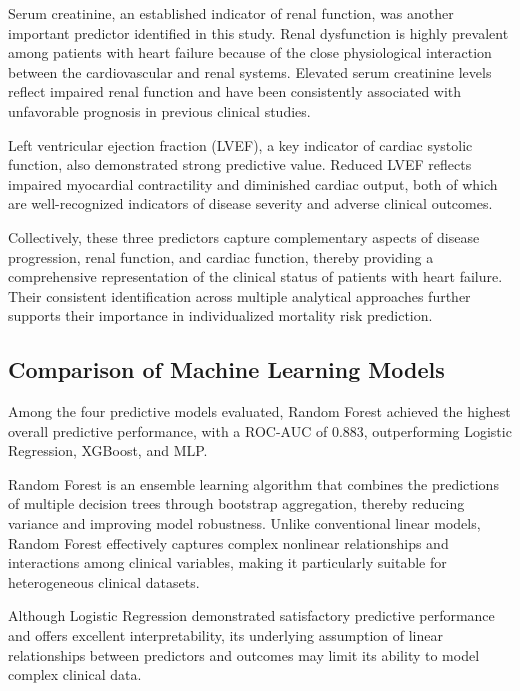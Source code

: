 \documentclass[12pt]{article}
\begin{document}
Serum creatinine, an established indicator of renal function, was another important predictor identified in this study. Renal dysfunction is highly prevalent among patients with heart failure because of the close physiological interaction between the cardiovascular and renal systems. Elevated serum creatinine levels reflect impaired renal function and have been consistently associated with unfavorable prognosis in previous clinical studies.\cite{McDonagh2021,Damman2014}

Left ventricular ejection fraction (LVEF), a key indicator of cardiac systolic function, also demonstrated strong predictive value. Reduced LVEF reflects impaired myocardial contractility and diminished cardiac output, both of which are well-recognized indicators of disease severity and adverse clinical outcomes.\cite{McDonagh2021,Heidenreich2022}

Collectively, these three predictors capture complementary aspects of disease progression, renal function, and cardiac function, thereby providing a comprehensive representation of the clinical status of patients with heart failure. Their consistent identification across multiple analytical approaches further supports their importance in individualized mortality risk prediction. 

\subsection{Comparison of Machine Learning Models}

Among the four predictive models evaluated, Random Forest achieved the highest overall predictive performance, with a ROC-AUC of 0.883, outperforming Logistic Regression, XGBoost, and MLP.\cite{Rajkomar2019}

Random Forest is an ensemble learning algorithm that combines the predictions of multiple decision trees through bootstrap aggregation, thereby reducing variance and improving model robustness. Unlike conventional linear models, Random Forest effectively captures complex nonlinear relationships and interactions among clinical variables, making it particularly suitable for heterogeneous clinical datasets.\cite{Breiman2001}

Although Logistic Regression demonstrated satisfactory predictive performance and offers excellent interpretability, its underlying assumption of linear relationships between predictors and outcomes may limit its ability to model complex clinical data.\cite{Hosmer2013}
\end{document}
